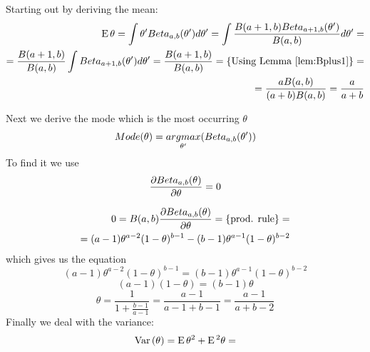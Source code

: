 \documentclass[a4paper,twoside=false,abstract=false,numbers=noenddot,
titlepage=false,headings=small,parskip=half,version=last]{scrartcl}
\begin{document}
\begin{solution}
    Starting out by deriving the mean: 
    \begin{equation}
        \begin{split}
            {\rm E}\,\theta = \int\theta'Beta_{a,b}(\theta')d\theta' =
            \int\frac{B(a+1,b)Beta_{a+1,b}(\theta')}{B(a,b)}d\theta' = \\
            = \frac{B(a+1,b)}{B(a,b)}\int{Beta_{a+1,b}(\theta')d\theta'} =
            \frac{B(a+1,b)}{B(a,b)} = \{\text{Using Lemma \ref{lem:Bplus1}}\}=\\
            =\frac{aB(a,b)}{(a+b)B(a,b)}=\frac{a}{a+b}
        \end{split}
    \end{equation}
    
    Next we derive the mode which is the most occurring $\theta$
    \begin{equation}
        Mode(\theta)=\underset{\theta'}{argmax}(Beta_{a,b}(\theta'))
    \end{equation}
    To find it we use
    \begin{equation}
        \frac{\partial{Beta_{a,b}(\theta)}}{\partial{\theta}}=0
    \end{equation}

    \begin{equation}
        \begin{split}
            0=B(a,b)\frac{\partial{Beta_{a,b}(\theta)}}{\partial{\theta}}=\{\text{prod. rule}\}= \\
            =(a-1)\theta^{a-2}(1-\theta)^{b-1}-(b-1)\theta^{a-1}(1-\theta)^{b-2}
        \end{split}
    \end{equation}
    which gives us the equation
    \begin{equation}
        (a-1)\theta^{a-2}(1-\theta)^{b-1}=(b-1)\theta^{a-1}(1-\theta)^{b-2}
    \end{equation}
    \begin{equation}
        (a-1)(1-\theta)=(b-1)\theta 
    \end{equation}
    \begin{equation}
        \theta=\frac{1}{1+\frac{b-1}{a-1}}=\frac{a-1}{a-1+b-1}=\frac{a-1}{a+b-2} 
    \end{equation}
    Finally we deal with the variance:
    \begin{equation}
        \begin{split}
            {\rm Var}\,(\theta)={\rm E}\,\theta^2+{\rm E}\,^2\theta=
        \end{split}    
    \end{equation}

\end{solution}
\end{document}
